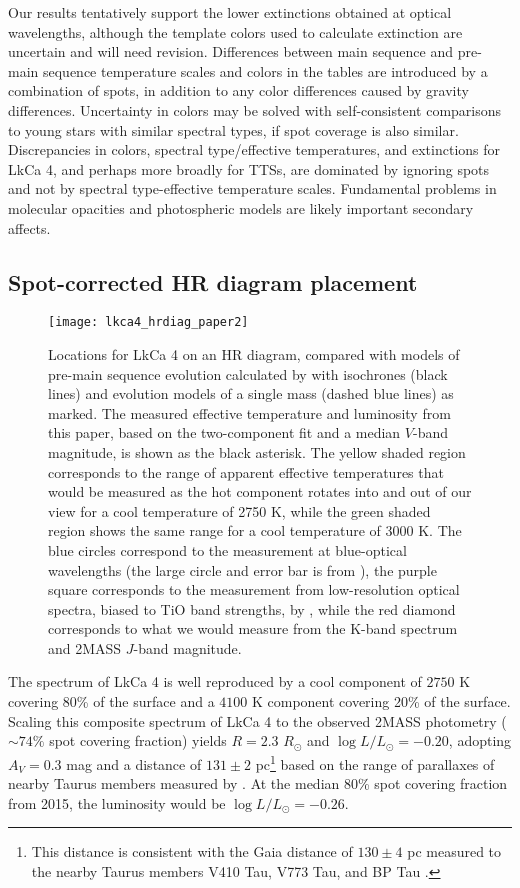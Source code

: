 \documentclass[twocolumn]{emulateapj}%
\begin{document}
Our results tentatively support the lower extinctions obtained at optical wavelengths, although the template colors used to calculate extinction are uncertain and will need revision.  Differences between main sequence and pre-main sequence temperature scales and colors in the \citet{pecaut13} tables are introduced by a combination of spots, in addition to any color differences caused by gravity differences.
Uncertainty in colors may be solved with self-consistent comparisons to young stars with similar spectral types, if spot coverage is also similar.  Discrepancies in colors, spectral type/effective temperatures, and extinctions for LkCa 4, and perhaps more broadly for TTSs, are dominated by ignoring spots and not by spectral type-effective temperature scales.  Fundamental problems in molecular opacities and photospheric models are likely important secondary affects.


\subsection{Spot-corrected HR diagram placement}

\begin{figure*}
 \centering
 \texttt{[image: lkca4\_hrdiag\_paper2]}
 \caption{Locations for LkCa 4 on an HR diagram, compared with models of pre-main sequence evolution calculated by \citet{baraffe15} with isochrones (black lines) and evolution models of a single mass (dashed blue lines) as marked.  The measured effective temperature and luminosity from this paper, based on the two-component fit and a median $V$-band magnitude, is shown as the black asterisk.  The yellow shaded region corresponds to the range of apparent effective temperatures that would be measured as the hot component rotates into and out of our view for a cool temperature of 2750 K, while the green shaded region shows the same range for a cool temperature of 3000 K.  The blue circles correspond to the measurement at blue-optical wavelengths (the large circle and error bar is from \citet{donati14}), the purple square corresponds to the measurement from low-resolution optical spectra, biased to TiO band strengths, by \citet[][biased to TiO bands]{herczeg14}, while the red diamond corresponds to what we would measure from the K-band spectrum and 2MASS $J$-band magnitude.}
 \label{fig:hrdiag}
\end{figure*}

The spectrum of LkCa 4 is well reproduced by a cool component of $2750$ K covering 80\% of the surface and a $4100$ K component covering 20\% of the surface.   Scaling this composite spectrum of LkCa 4 to the observed 2MASS photometry ($\sim 74\%$ spot covering fraction) yields $R=2.3$ $R_\odot$ and $\log L/L_\odot=-0.20$, adopting $A_V=0.3$ mag and a distance of $131 \pm 2$ pc\footnote{This distance is consistent with the Gaia distance of $130 \pm4$ pc measured to the nearby Taurus members V410 Tau, V773 Tau, and BP Tau \citep{gaia2016dr}.} based on the range of parallaxes of nearby Taurus members measured by \citet{torres12}.  
At the median 80\% spot covering fraction from 2015, the luminosity would be $\log L/L_\odot=-0.26$.
\end{document}
